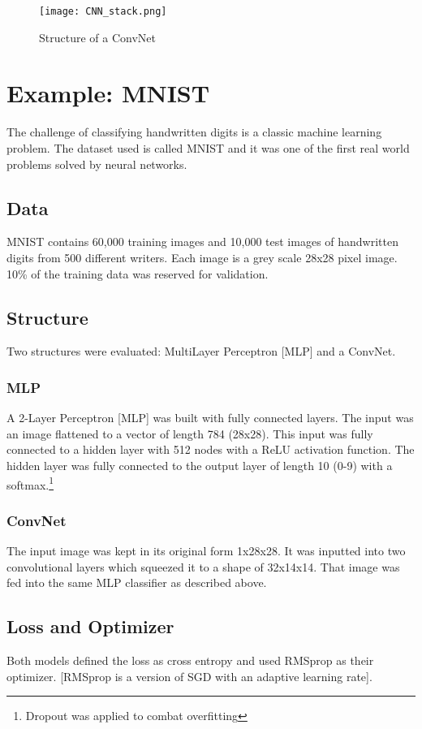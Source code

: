 \begin{figure}[!h]
 \begin{center}
 \texttt{[image: CNN\_stack.png]}
 \caption{Structure of a ConvNet \cite{Udacity}}
 \label{fig:ConvNet}
 \end{center}
\end{figure}

\section{Example: MNIST}
The challenge of classifying handwritten digits is a classic machine learning problem.  The dataset used is called MNIST and it was one of the first real world problems solved by neural networks.  
\subsection{Data}
MNIST contains 60,000 training images and 10,000 test images of handwritten digits from 500 different writers.  Each image is a grey scale 28x28 pixel image.  10\% of the training data was reserved for validation.  
\subsection{Structure}
Two structures were evaluated: MultiLayer Perceptron [MLP] and a ConvNet.
\subsubsection{MLP}
A 2-Layer Perceptron [MLP] was built with fully connected layers. The input was an image flattened to a vector of length 784 (28x28).  This input was fully connected to a hidden layer with 512 nodes with a ReLU activation function.  The hidden layer was fully connected to the output layer of length 10 (0-9) with a softmax.\footnote{Dropout was applied to combat overfitting}

\subsubsection{ConvNet}
The input image was kept in its original form 1x28x28.  It was inputted into two convolutional layers which squeezed it to a shape of 32x14x14.  That image was fed into the same MLP classifier as described above.
\subsection{Loss and Optimizer}
Both models defined the loss as cross entropy and used RMSprop as their optimizer.  [RMSprop is a version of SGD with an adaptive learning rate].
